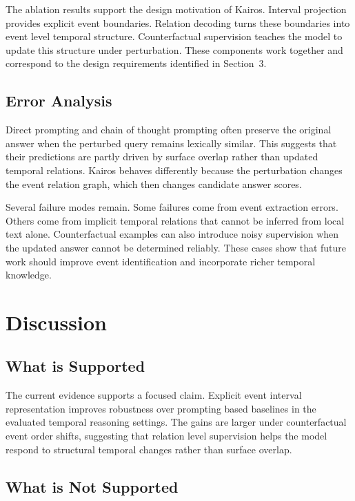 \documentclass[11pt]{article}
\newcommand{\method}{Kairos}
\begin{document}
The ablation results support the design motivation of \method. Interval projection provides explicit event boundaries. Relation decoding turns these boundaries into event level temporal structure. Counterfactual supervision teaches the model to update this structure under perturbation. These components work together and correspond to the design requirements identified in Section~3.

\subsection{Error Analysis}

Direct prompting and chain of thought prompting often preserve the original answer when the perturbed query remains lexically similar. This suggests that their predictions are partly driven by surface overlap rather than updated temporal relations. \method{} behaves differently because the perturbation changes the event relation graph, which then changes candidate answer scores.

Several failure modes remain. Some failures come from event extraction errors. Others come from implicit temporal relations that cannot be inferred from local text alone. Counterfactual examples can also introduce noisy supervision when the updated answer cannot be determined reliably. These cases show that future work should improve event identification and incorporate richer temporal knowledge.

\section{Discussion}

\subsection{What is Supported}

The current evidence supports a focused claim. Explicit event interval representation improves robustness over prompting based baselines in the evaluated temporal reasoning settings. The gains are larger under counterfactual event order shifts, suggesting that relation level supervision helps the model respond to structural temporal changes rather than surface overlap.

\subsection{What is Not Supported}
\end{document}
